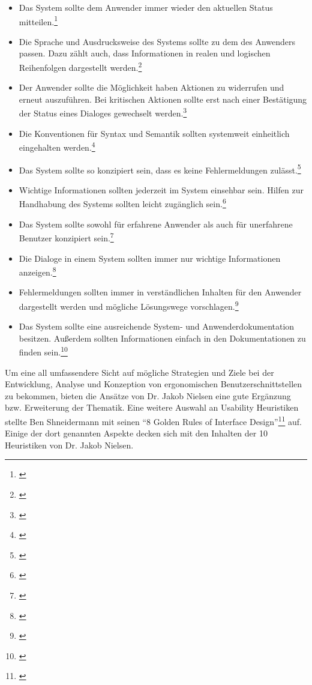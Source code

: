 \begin{itemize}
    \setlength{\itemsep}{0pt}
    \setlength{\parskip}{5pt}
    \setlength{\parsep}{3pt}
    \item Das System sollte dem Anwender immer wieder den aktuellen Status mitteilen.\footnote{\cite[vgl.][]{Nielsen1995}}
    \item Die Sprache und Ausdrucksweise des Systems sollte zu dem des Anwenders passen. Dazu zählt auch, dass Informationen in realen und logischen Reihenfolgen dargestellt werden.\footnote{\cite[vgl.][]{Nielsen1995}}
    \item Der Anwender sollte die Möglichkeit haben Aktionen zu widerrufen und erneut auszuführen. Bei kritischen Aktionen sollte erst nach einer Bestätigung der Status eines Dialoges gewechselt werden.\footnote{\cite[vgl.][]{Nielsen1995}}
    \item Die Konventionen für Syntax und Semantik sollten systemweit einheitlich eingehalten werden.\footnote{\cite[vgl.][]{Nielsen1995}}
    \item Das System sollte so konzipiert sein, dass es keine Fehlermeldungen zulässt.\footnote{\cite[vgl.][]{Nielsen1995}}
    \item Wichtige Informationen sollten jederzeit im System einsehbar sein. Hilfen zur Handhabung des Systems sollten leicht zugänglich sein.\footnote{\cite[vgl.][]{Nielsen1995}}
    \item Das System sollte sowohl für erfahrene Anwender als auch für unerfahrene Benutzer konzipiert sein.\footnote{\cite[vgl.][]{Nielsen1995}}
    \item Die Dialoge in einem System sollten immer nur wichtige Informationen anzeigen.\footnote{\cite[vgl.][]{Nielsen1995}}
    \item Fehlermeldungen sollten immer in verständlichen Inhalten für den Anwender dargestellt werden und mögliche Lösungswege vorschlagen.\footnote{\cite[vgl.][]{Nielsen1995}}
    \item Das System sollte eine ausreichende System- und Anwenderdokumentation besitzen. Außerdem sollten Informationen einfach in den Dokumentationen zu finden sein.\footnote{\cite[vgl.][]{Nielsen1995}}
\end{itemize}

Um eine all umfassendere Sicht auf mögliche Strategien und Ziele bei der Entwicklung, Analyse und Konzeption von ergonomischen Benutzerschnittstellen zu bekommen, bieten die Ansätze von Dr. Jakob Nielsen eine gute Ergänzung bzw. Erweiterung der Thematik. Eine weitere Auswahl an Usability Heuristiken stellte Ben Shneidermann mit seinen \enquote{8 Golden Rules of Interface Design}\footnote{\cite{Wong2018}} auf. Einige der dort genannten Aspekte decken sich mit den Inhalten der 10 Heuristiken von Dr. Jakob Nielsen.

